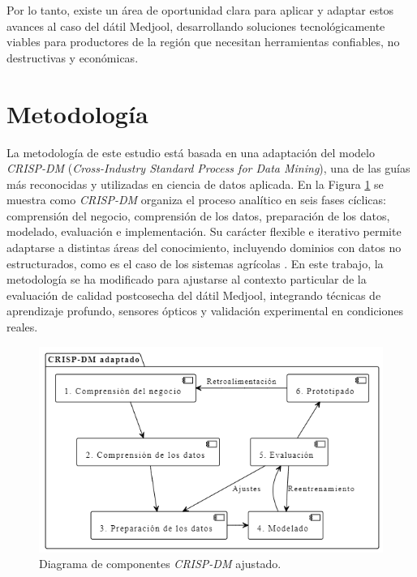 Por lo tanto, existe un área de oportunidad clara para aplicar y adaptar estos avances al caso del dátil Medjool, desarrollando soluciones tecnológicamente viables para productores de la región que necesitan herramientas confiables, no destructivas y económicas.

\newpage


\section{Metodología}

La metodología de este estudio está basada en una adaptación del modelo \textit{CRISP-DM} (\textit{Cross-Industry Standard Process for Data Mining}), una de las guías más reconocidas y utilizadas en ciencia de datos aplicada. En la Figura \ref{fig:componentes} se muestra como \textit{CRISP-DM} organiza el proceso analítico en seis fases cíclicas: comprensión del negocio, comprensión de los datos, preparación de los datos, modelado, evaluación e implementación. Su carácter flexible e iterativo permite adaptarse a distintas áreas del conocimiento, incluyendo dominios con datos no estructurados, como es el caso de los sistemas agrícolas \parencite{shimaoka_evolution_2024, saltz_crisp-dm_2021}. En este trabajo, la metodología se ha modificado para ajustarse al contexto particular de la evaluación de calidad postcosecha del dátil Medjool, integrando técnicas de aprendizaje profundo, sensores ópticos y validación experimental en condiciones reales.

\begin{figure}[th]
\centering
\includegraphics[scale=0.75]{Figures/componentes.png}
\decoRule
\caption{Diagrama de componentes \textit{CRISP-DM} ajustado.}
\label{fig:componentes}
\end{figure}

